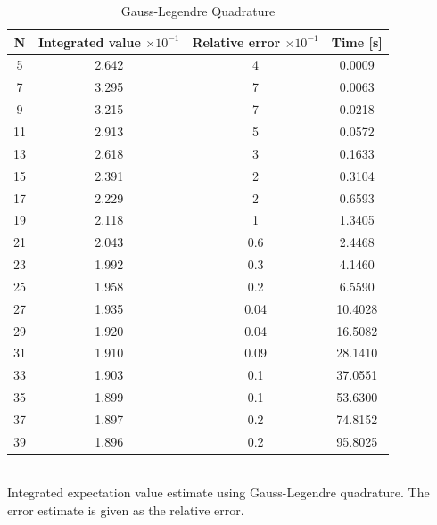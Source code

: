 \documentclass[%
reprint,nofootinbib,
amsmath,amssymb,
aps,
]{revtex4-1}
\begin{document}
\begin{table}[!h]
	\caption {Gauss-Legendre Quadrature} 
	\begin{tabular}{|c|c|c|c|}
		\hline 
		\hspace{5mm} \textbf{N} \hspace{5mm} & \textbf{Integrated value $\times 10^{-1}$} & \hspace{3mm}\textbf{Relative error $\times 10^{-1}$} & \hspace{3mm}\textbf{Time  [s]} \hspace{5mm}\\
		\hline 
			5 & 2.642  & 4  & 0.0009 \\
			7 & 3.295  & 7  & 0.0063 \\
			9 & 3.215  & 7  & 0.0218 \\
			11 & 2.913  & 5  & 0.0572 \\
			13 & 2.618  & 3  & 0.1633 \\
			15 & 2.391  & 2  & 0.3104 \\
			17 & 2.229  & 2  & 0.6593 \\
			19 & 2.118  & 1  & 1.3405 \\
			21 & 2.043  & 0.6  & 2.4468 \\
			23 & 1.992  & 0.3  & 4.1460 \\
			25 & 1.958  & 0.2  & 6.5590 \\
			27 & 1.935  & 0.04  & 10.4028 \\
			29 & 1.920  & 0.04  & 16.5082 \\
			31 & 1.910  & 0.09  & 28.1410 \\
			33 & 1.903  & 0.1  & 37.0551 \\
			35 & 1.899  & 0.1  & 53.6300 \\
			37 & 1.897  & 0.2  & 74.8152 \\
			39 & 1.896  & 0.2  & 95.8025 \\

		\hline 
	\end{tabular} \\ [5pt]
	\label{legendre_values} \centering  Integrated expectation value estimate using Gauss-Legendre quadrature. The error estimate is given as the relative error.
\end{table}
\end{document}
